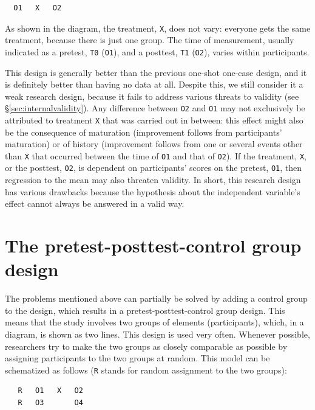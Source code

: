 \documentclass[
]{book}
\begin{document}
\begin{verbatim}
  O1   X   O2
\end{verbatim}

As shown in the diagram, the treatment, \texttt{X}, does not vary: everyone gets the same treatment, because there is just one group. The time of measurement, usually indicated as a pretest, \texttt{T0} (\texttt{O1}), and a posttest, \texttt{T1} (\texttt{O2}), varies within participants.

This design is generally better than the previous one-shot one-case design, and it is definitely better than having no data at all. Despite this, we still consider it a weak research design, because it fails to address various threats to validity (see §\ref{sec:internalvalidity}). Any difference between \texttt{O2} and \texttt{O1} may not exclusively be attributed to treatment \texttt{X} that was carried out in between: this effect might also be the consequence of maturation (improvement follows from participants' maturation) or of history (improvement follows from one or several events other than \texttt{X} that occurred between the time of \texttt{O1} and that of \texttt{O2}). If the treatment, \texttt{X}, or the posttest, \texttt{O2}, is dependent on participants' scores on the pretest, \texttt{O1}, then regression to the mean may also threaten validity. In short, this research design has various drawbacks because the hypothesis about the independent variable's effect cannot always be answered in a valid way.

\section{The pretest-posttest-control group design}\label{sec:pretest-posttest-control-group-design}

The problems mentioned above can partially be solved by adding a control group to the design, which results in a pretest-posttest-control group design. This means that the study involves two groups of elements (participants), which, in a diagram, is shown as two lines. This design is used very often. Whenever possible, researchers try to make the two groups as closely comparable as possible by assigning participants to the two groups at random. This model can be schematized as follows (\texttt{R} stands for random assignment to the two groups):

\begin{verbatim}
   R   O1   X   O2
   R   O3       O4
\end{verbatim}
\end{document}
